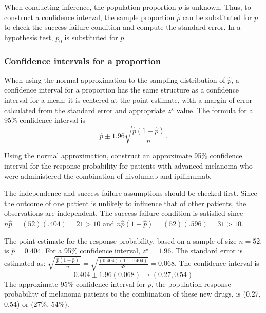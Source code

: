When conducting inference, the population proportion $p$ is unknown. Thus, to construct a confidence interval, the sample proportion $\hat{p}$ can be substituted for $p$ to check the success-failure condition and compute the standard error. In a hypothesis test, $p_0$ is substituted for $p$.

\subsubsection{Confidence intervals for a proportion}
\label{confIntForPropSection}


When using the normal approximation to the sampling distribution of $\hat{p}$, a confidence interval for a proportion has the same structure as a confidence interval for a mean; it is centered at the point estimate, with a margin of error calculated from the standard error and appropriate $z^{\star}$ value.  The formula for a 95\% confidence interval is
\[
  \hat{p} \pm 1.96 \sqrt{\frac{\hat{p}(1-\hat{p})}{n}}.
\]

\begin{examplewrap}
\begin{nexample}{Using the normal approximation, construct an approximate 95\% confidence interval for the response probability for patients with advanced melanoma who were administered the combination of nivolumab and ipilimumab.}

The independence and success-failure assumptions should be checked first.  Since the outcome of one patient is unlikely to influence that of other patients, the observations are independent.  The success-failure condition is satisfied since $n\hat{p} = (52)(.404) = 21  > 10$ and $n\hat{p}(1 - \hat{p}) = (52)(.596) = 31  > 10$.

The point estimate for the response probability, based on a sample of size $n = 52$, is $\hat{p} = 0.404$. For a 95\% confidence interval, $z^{\star} = 1.96$. The standard error is estimated as: $\sqrt{\frac{\ \hat{p}(1-\hat{p})\ }{n}} = \sqrt{\frac{(0.404)(1-0.404)}{52}} = 0.068$.  The confidence interval is
\[0.404 \pm 1.96 (0.068) \rightarrow (0.27, 0.54) \]
The approximate 95\% confidence interval for $p$, the population response probability of melanoma patients to the combination of these new drugs, is (0.27, 0.54) or (27\%, 54\%).  
\end{nexample}
\end{examplewrap}

